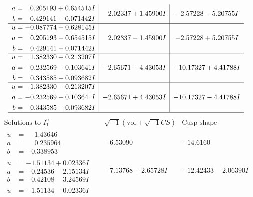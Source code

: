 \documentclass[1p]{elsarticle_modified}
\theoremstyle{definition}
\newcommand{\I}{\sqrt{-1}}
\begin{document}
$$\begin{array}{c|c|c}
\begin{aligned}
a &= \phantom{-}0.205193 + 0.654515 I \\
b &= \phantom{-}0.429141 - 0.071442 I\end{aligned}
 & \phantom{-}2.02337 + 1.45900 I & -2.57228 - 5.20755 I \\ \hline\begin{aligned}
u &= -0.087774 - 0.628145 I \\
a &= \phantom{-}0.205193 - 0.654515 I \\
b &= \phantom{-}0.429141 + 0.071442 I\end{aligned}
 & \phantom{-}2.02337 - 1.45900 I & -2.57228 + 5.20755 I \\ \hline\begin{aligned}
u &= \phantom{-}1.382330 + 0.213207 I \\
a &= -0.232569 + 0.103641 I \\
b &= \phantom{-}0.343585 - 0.093682 I\end{aligned}
 & -2.65671 - 4.43053 I & -10.17327 + 4.41788 I \\ \hline\begin{aligned}
u &= \phantom{-}1.382330 - 0.213207 I \\
a &= -0.232569 - 0.103641 I \\
b &= \phantom{-}0.343585 + 0.093682 I\end{aligned}
 & -2.65671 + 4.43053 I & -10.17327 - 4.41788 I\\
 \hline 
 \end{array}$$\newpage$$\begin{array}{c|c|c}  
\text{Solutions to }I^u_{1}& \I (\text{vol} + \sqrt{-1}CS) & \text{Cusp shape}\\
 \hline 
\begin{aligned}
u &= \phantom{-}1.43646\phantom{ +0.000000I} \\
a &= \phantom{-}0.235964\phantom{ +0.000000I} \\
b &= -0.338953\phantom{ +0.000000I}\end{aligned}
 & -6.53090\phantom{ +0.000000I} & -14.6160\phantom{ +0.000000I} \\ \hline\begin{aligned}
u &= -1.51134 + 0.02336 I \\
a &= -0.24536 - 2.15134 I \\
b &= -0.42108 - 3.24569 I\end{aligned}
 & -7.13768 + 2.65728 I & -12.42433 - 2.06390 I \\ \hline\begin{aligned}
u &= -1.51134 - 0.02336 I \\

\end{aligned}
\end{array}$$
\end{document}
